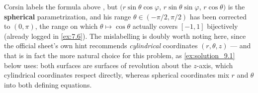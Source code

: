 \begin{ainote}
Corsin labels the formula above , but $(r\sin\theta\cos\varphi$, $r\sin\theta\sin\varphi$, $r\cos\theta)$ is the \textbf{spherical} parametrization, and his
range $\theta \in (-\pi/2,\pi/2)$ has been corrected to $(0,\pi)$, the range on which
$\theta \mapsto \cos\theta$ actually covers $[-1,1]$ bijectively (already logged in \cref{ex:7.6}). The mislabelling is doubly worth noting here, since the official sheet's own hint
recommends \emph{cylindrical} coordinates $(r,\theta,z)$ --- and that is in fact the more
natural choice for this problem, as \cref{ex:solution_9.1} below uses: both surfaces are
surfaces of revolution about the $z$-axis, which cylindrical coordinates respect directly,
whereas spherical coordinates mix $r$ and $\theta$ into both defining equations.
\end{ainote}
